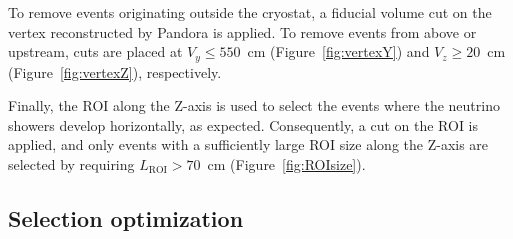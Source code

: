 To remove events originating outside the cryostat, a fiducial volume cut on the vertex reconstructed by Pandora is applied. To remove events from above or upstream, cuts are placed at $V_y \leq 550$~cm (Figure~\ref{fig:vertexY}) and $V_z \geq 20$~cm (Figure~\ref{fig:vertexZ}), respectively.

 
Finally, the ROI along the Z-axis is used to select the events where the neutrino showers develop horizontally, as expected. Consequently, a cut on the ROI is applied, and only events with a sufficiently large ROI size along the Z-axis are selected by requiring $L_{\text{ROI}} > 70$~cm (Figure~\ref{fig:ROIsize}).


\subsection{Selection optimization}

\newpage


